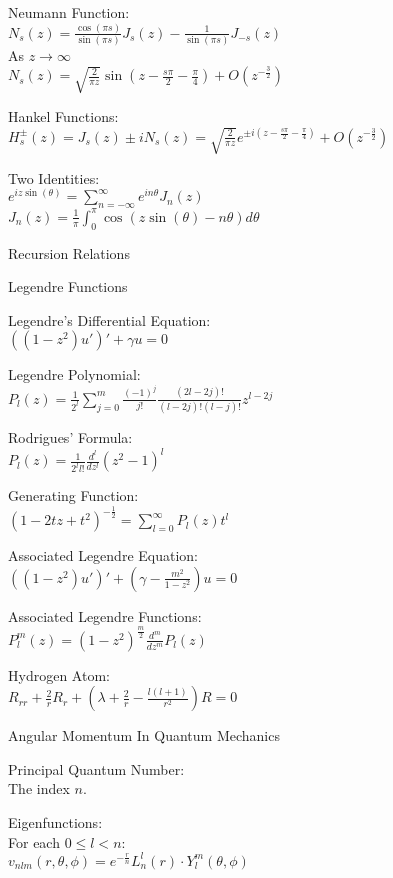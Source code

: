 Neumann Function: \\
$N_s (z) = \frac{\cos (\pi s)}{\sin (\pi s)} J_s (z) - \frac{1}{\sin (\pi s)} J_{-s} (z)$ \\
As $z \to \infty$ \\
$N_s (z) = \sqrt{\frac{2}{\pi z}} \sin \left(z-\frac{s \pi}{2}-\frac{\pi}{4} \right) + O(z^{-\frac{3}{2}})$

Hankel Functions: \\
$H_s^{\pm} (z) = J_s (z) \pm iN_s (z) = \sqrt{\frac{2}{\pi z}} e^{\pm i (z-\frac{s \pi}{2} - \frac{\pi}{4})} + O(z^{-\frac{3}{2}})$

Two Identities: \\
$e^{iz \sin (\theta)}=\sum_{n=-\infty}^{\infty} e^{i n \theta} J_n (z)$ \\
$J_n (z) = \frac{1}{\pi} \int_0^{\pi} \cos (z\sin(\theta)-n\theta) d \theta$

Recursion Relations

Legendre Functions

Legendre's Differential Equation: \\
$((1-z^2)u')'+\gamma u=0$

Legendre Polynomial: \\
$P_l (z) = \frac{1}{2^l} \sum_{j=0}^m \frac{(-1)^j}{j!} \frac{(2l-2j)!}{(l-2j)!(l-j)!} z^{l-2j}$

Rodrigues' Formula: \\
$P_l (z)=\frac{1}{2^l l!} \frac{d^l}{dz^l} (z^2-1)^l$

Generating Function: \\
$(1-2tz+t^2)^{-\frac{1}{2}}=\sum_{l=0}^{\infty} P_l (z) t^l$

Associated Legendre Equation: \\
$((1-z^2) u')' + \left(\gamma - \frac{m^2}{1-z^2} \right) u = 0$

Associated Legendre Functions: \\
$P_l^m (z)=(1-z^2)^{\frac{m}{2}} \frac{d^m}{dz^m} P_l (z)$

Hydrogen Atom: \\
$R_{rr}+\frac{2}{r}R_r+\left(\lambda + \frac{2}{r} - \frac{l(l+1)}{r^2} \right) R = 0$

Angular Momentum In Quantum Mechanics

Principal Quantum Number: \\
The index $n$.

Eigenfunctions: \\
For each $0 \le l < n$: \\
$v_{nlm} (r,\theta,\phi) = e^{-\frac{r}{n}} L_n^l (r) \cdot Y_l^m (\theta,\phi)$

